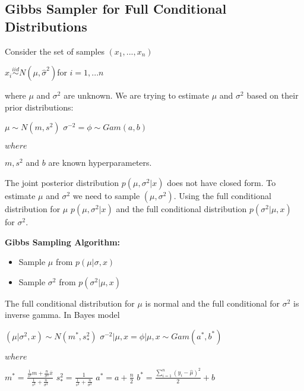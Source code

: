 \documentclass[11pt,a4paper]{article}
\theoremstyle{plain}
\begin{document}
\newpage
\subsection*{Gibbs Sampler for Full Conditional Distributions}
Consider the set of samples $(x_1,...,x_n)$ 
\begin{center}
$x_i\overset{iid}\sim N(\mu,\hat\sigma^2)$for $i=1,...n$
\end{center}
where $\mu$ and $\sigma^2$ are unknown. 
\newline We are trying to estimate $\mu$ and $\sigma^2$ based on their prior distributions:
\begin{center}
 $\mu \sim N(m,s^2)$
\newline $\sigma^{-2}=\phi \sim Gam(a,b)$ 
\end{center}
$where$ 
\begin{center}$m,s^2$ and $b$ are known hyperparameters.
\end{center}
 The joint posterior distribution $p(\mu,\sigma^2|x)$ does not have closed form. To estimate $\mu$ and $\sigma^2$ we need to sample $(\mu,\sigma^2)$. Using  the full conditional distribution for $\mu$ $p(\mu,\sigma^2|x)$ and the full conditional distribution $p(\sigma^2|\mu,x)$ for $\sigma^2$.


{\bf Gibbs Sampling Algorithm:}
\begin{itemize}
  \item Sample $\mu$ from $p(\mu|\sigma,x)$ 
  \item Sample $\sigma^2$ from $p(\sigma^2|\mu,x)$
\end{itemize}

The full conditional distribution for $\mu$ is normal and the full conditional for $\sigma^2$ is inverse gamma. In Bayes model

\begin{center}
$(\mu|\sigma^2,x)\sim N(m^*,s_*^2)$
\newline $\sigma^{-2}|\mu,x=\phi|\mu,x\sim Gam(a^*,b^*)$
\end{center}
$where$
\begin{center}
$m^*=\frac{\frac{1}{s^2}m+\frac{n}{\sigma^2}\bar x}{\frac{1}{s^2}+\frac{n}{\sigma^2}}$
\newline $s_*^2=\frac{1}{\frac{1}{s^2}+\frac{n}{\sigma^2}}$
\newline $a^*=a+\frac{n}{2}$
\newline $b^*=\frac{\sum_{i=1}^n (y_i-\hat\mu)^2}{2}+b$
\end{center}
\end{document}

